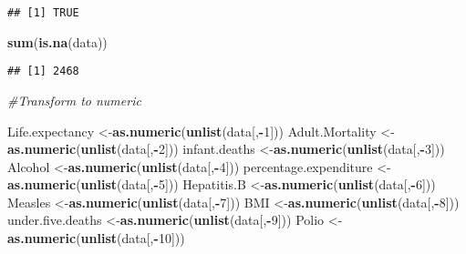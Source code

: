 \documentclass[
]{article}
\newenvironment{Shaded}{\begin{snugshade}}{\end{snugshade}}
\newcommand{\CommentTok}[1]{\textcolor[rgb]{0.56,0.35,0.01}{\textit{#1}}}
\newcommand{\DecValTok}[1]{\textcolor[rgb]{0.00,0.00,0.81}{#1}}
\newcommand{\FunctionTok}[1]{\textcolor[rgb]{0.13,0.29,0.53}{\textbf{#1}}}
\newcommand{\NormalTok}[1]{#1}
\newcommand{\OtherTok}[1]{\textcolor[rgb]{0.56,0.35,0.01}{#1}}
\newcommand{\SpecialCharTok}[1]{\textcolor[rgb]{0.81,0.36,0.00}{\textbf{#1}}}
\begin{document}
\begin{verbatim}
## [1] TRUE
\end{verbatim}

\begin{Shaded}
\begin{Highlighting}[]
\FunctionTok{sum}\NormalTok{(}\FunctionTok{is.na}\NormalTok{(data))}
\end{Highlighting}
\end{Shaded}

\begin{verbatim}
## [1] 2468
\end{verbatim}

\begin{Shaded}
\begin{Highlighting}[]
\CommentTok{\#Transform to numeric}

\NormalTok{Life.expectancy }\OtherTok{\textless{}{-}}\FunctionTok{as.numeric}\NormalTok{(}\FunctionTok{unlist}\NormalTok{(data[,}\SpecialCharTok{{-}}\DecValTok{1}\NormalTok{]))}
\NormalTok{Adult.Mortality }\OtherTok{\textless{}{-}}\FunctionTok{as.numeric}\NormalTok{(}\FunctionTok{unlist}\NormalTok{(data[,}\SpecialCharTok{{-}}\DecValTok{2}\NormalTok{]))}
\NormalTok{infant.deaths }\OtherTok{\textless{}{-}}\FunctionTok{as.numeric}\NormalTok{(}\FunctionTok{unlist}\NormalTok{(data[,}\SpecialCharTok{{-}}\DecValTok{3}\NormalTok{]))}
\NormalTok{Alcohol }\OtherTok{\textless{}{-}}\FunctionTok{as.numeric}\NormalTok{(}\FunctionTok{unlist}\NormalTok{(data[,}\SpecialCharTok{{-}}\DecValTok{4}\NormalTok{]))}
\NormalTok{percentage.expenditure }\OtherTok{\textless{}{-}}\FunctionTok{as.numeric}\NormalTok{(}\FunctionTok{unlist}\NormalTok{(data[,}\SpecialCharTok{{-}}\DecValTok{5}\NormalTok{]))}
\NormalTok{Hepatitis.B }\OtherTok{\textless{}{-}}\FunctionTok{as.numeric}\NormalTok{(}\FunctionTok{unlist}\NormalTok{(data[,}\SpecialCharTok{{-}}\DecValTok{6}\NormalTok{]))}
\NormalTok{Measles }\OtherTok{\textless{}{-}}\FunctionTok{as.numeric}\NormalTok{(}\FunctionTok{unlist}\NormalTok{(data[,}\SpecialCharTok{{-}}\DecValTok{7}\NormalTok{]))}
\NormalTok{BMI }\OtherTok{\textless{}{-}}\FunctionTok{as.numeric}\NormalTok{(}\FunctionTok{unlist}\NormalTok{(data[,}\SpecialCharTok{{-}}\DecValTok{8}\NormalTok{]))}
\NormalTok{under.five.deaths }\OtherTok{\textless{}{-}}\FunctionTok{as.numeric}\NormalTok{(}\FunctionTok{unlist}\NormalTok{(data[,}\SpecialCharTok{{-}}\DecValTok{9}\NormalTok{]))}
\NormalTok{Polio }\OtherTok{\textless{}{-}}\FunctionTok{as.numeric}\NormalTok{(}\FunctionTok{unlist}\NormalTok{(data[,}\SpecialCharTok{{-}}\DecValTok{10}\NormalTok{]))}

\end{Highlighting}
\end{Shaded}
\end{document}
